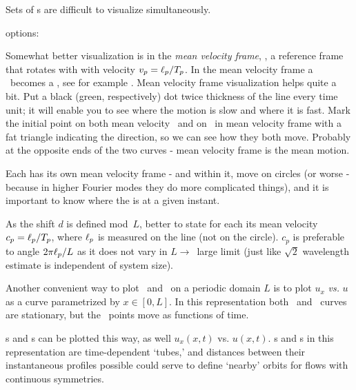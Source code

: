 Sets of \rpo s are difficult to visualize simultaneously.

options:

Somewhat better visualization is in the
{\em mean velocity frame}, {\ie},
a reference frame that rotates with with velocity
$v_p=\ell_p/{T_{p}}$.
In the mean velocity frame a \rpo\ becomes
a \po, see  for example .
Mean velocity frame visualization helps quite a bit.
Put a black (green, respectively) dot
twice thickness of the line every time unit; it will enable you to see
where the motion is slow and where it is fast.
Mark the initial point on both
mean velocity \rpo\ and on \eqv\  in mean velocity
 frame with a fat triangle
indicating the direction, so we can see how they both move. Probably at the
opposite ends of the two curves - mean velocity frame is the mean motion.


Each {\rpo} has its own mean velocity frame - and within it, {\eqv}
move on circles (or worse - because in higher Fourier modes they do more
complicated things), and it is important to know where the {\eqv} is at
a given instant.

As the shift $d$ is defined mod~$L$, better to
state for each {\rpo} its mean velocity $c_p = \ell_p/{T_{p}}$,
where $\ell_p$ is measured on the line (not on the circle). $c_p$ is
preferable to angle $2\pi \ell_p/L$ as it does not vary in $L \to$~large
limit (just like $\sqrt{2}$ wavelength estimate is independent of
system size).

Another convenient way to plot \eqva\ and \reqva\ on a periodic
domain $L$ is to plot
$u_x$ {\em vs.} $u$ as a curve parametrized by
$x\in [0,L]$.
In this representation both \eqva\ and \reqva\ curves are
stationary, but the \reqva\ points move as functions of time.

\Po s and \rpo s can be plotted this way, as well
$u_x(x,t)$ vs. $u(x,t)$. \Po s and \rpo s  in this representation
are time-dependent `tubes,' and distances between their instantaneous
profiles possible could serve to define `nearby' orbits for
flows with continuous symmetries.
